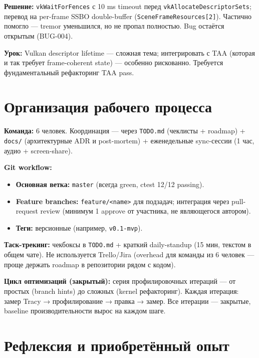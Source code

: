 \documentclass[
  11pt,a4paper,oneside]{article}
\providecommand{\tightlist}{%
  \setlength{\itemsep}{0pt}\setlength{\parskip}{0pt}}
\providecommand{\tightlist}{%
  \setlength{\itemsep}{0pt}\setlength{\parskip}{0pt}}
\begin{document}
\textbf{Решение:} \texttt{vkWaitForFences} с 10 ms timeout перед \texttt{vkAllocateDescriptorSets}; перевод на per-frame SSBO double-buffer (\texttt{SceneFrameResources{[}2{]}}). Частично помогло --- tremor уменьшился, но не пропал полностью. Bug остаётся открытым (BUG-004).

\textbf{Урок:} Vulkan descriptor lifetime --- сложная тема; интегрировать с TAA (которая и так требует frame-coherent state) --- особенно рискованно. Требуется фундаментальный рефакторинг TAA pass.

\section{Организация рабочего процесса}\label{ux43eux440ux433ux430ux43dux438ux437ux430ux446ux438ux44f-ux440ux430ux431ux43eux447ux435ux433ux43e-ux43fux440ux43eux446ux435ux441ux441ux430}

\textbf{Команда:} 6 человек. Координация --- через \texttt{TODO.md} (чеклисты + roadmap) + \texttt{docs/} (архитектурные ADR и post-mortem) + еженедельные sync-сессии (1 час, аудио + screen-share).

\textbf{Git workflow:}

\begin{itemize}
\tightlist
\item
  \textbf{Основная ветка:} \texttt{master} (всегда green, ctest 12/12 passing).
\item
  \textbf{Feature branches:} \texttt{feature/\textless{}name\textgreater{}} для подзадач; интеграция через pull-request review (минимум 1 approve от участника, не являющегося автором).
\item
  \textbf{Теги:} версионные (например, \texttt{v0.1-mvp}).
\end{itemize}

\textbf{Таск-трекинг:} чекбоксы в \texttt{TODO.md} + краткий daily-standup (15 мин, текстом в общем чате). Не используется Trello/Jira (overhead для команды из 6 человек --- проще держать roadmap в репозитории рядом с кодом).

\textbf{Цикл оптимизаций (закрытый):} серия профилировочных итераций --- от простых (branch hints) до сложных (kernel рефакторинг). Каждая итерация: замер Tracy → профилирование → правка → замер. Все итерации --- закрытые, baseline производительности вырос на каждом шаге.

\section{Рефлексия и приобретённый опыт}\label{ux440ux435ux444ux43bux435ux43aux441ux438ux44f-ux438-ux43fux440ux438ux43eux431ux440ux435ux442ux451ux43dux43dux44bux439-ux43eux43fux44bux442}
\end{document}
